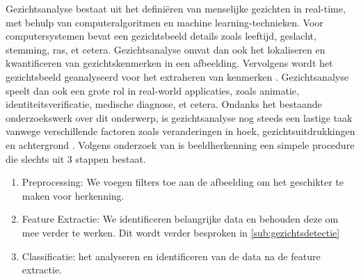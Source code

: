 Gezichtsanalyse bestaat uit het definiëren van menselijke gezichten in real-time, met behulp van computeralgoritmen en machine learning-technieken. Voor computersystemen bevat een gezichtsbeeld details zoals leeftijd, geslacht, stemming, ras, et cetera. 
Gezichtsanalyse omvat dan ook het lokaliseren en kwantificeren van gezichtskenmerken in een afbeelding. Vervolgens wordt het gezichtsbeeld geanalyseerd voor het extraheren van kenmerken \autocite{Sanil2023}. Gezichtsanalyse speelt dan ook een grote rol in real-world applicaties, zoals animatie, identiteitsverificatie, medische diagnose, et cetera. Ondanks het bestaande onderzoekswerk over dit onderwerp, is gezichtsanalyse nog steeds een lastige taak vanwege verschillende factoren zoals veranderingen in hoek, gezichtsuitdrukkingen en achtergrond \autocite{Siddiqi2022}. 
Volgens onderzoek van \textcite{BasystiukMR23} is beeldherkenning een simpele procedure die slechts uit 3 stappen bestaat. 
\begin{enumerate}
    \item Preprocessing: We voegen filters toe aan de afbeelding om het geschikter te maken voor herkenning.
    \item Feature Extractie: We identificeren belangrijke data en behouden deze om mee verder te werken. Dit wordt verder besproken in \ref{sub:gezichtsdetectie}
    \item Classificatie: het analyseren en identificeren van de  data na de feature extractie.
\end{enumerate}

